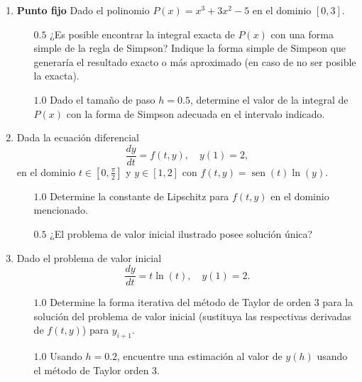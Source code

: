 \documentclass[12pt]{article}
\renewcommand{\sin}{\operatorname{sen}}
\DeclareMathOperator{\sen}{sen}
\renewcommand{\sin}{\sen}
\begin{document}
  \begin{enumerate}[leftmargin=*,widest=9]
    \item \textbf{Punto fijo} Dado el polinomio $P(x) = x^3 + 3x^2 - 5$ en el dominio $[0, 3]$.
    \begin{itemize}
    \item[$0.5$] ¿Es posible encontrar la integral exacta de $P(x)$ con una forma simple de la regla de Simpson? Indique la forma simple de Simpson que generaría el resultado exacto o más aproximado (en caso de no ser posible la exacta).
    
    \vspace{1cm}
    
    \item[$1.0$] Dado el tamaño de paso $h= 0.5$, determine el valor de la integral de $P(x)$ con la forma de Simpson adecuada en el intervalo indicado.
    
    \vspace{4cm}
    
    
    \end{itemize}
    
 \item Dada la ecuación diferencial $$ \frac{dy}{dt} = f(t, y), \quad y(1)= 2,$$ en el dominio $t \in \left[0, \frac{\pi}{2} \right]$ y $y \in [1, 2]$ con $f(t, y) = \sin(t) \ln(y)$.
    
    \begin{itemize}
    \item[$1.0$] Determine la constante de Lipschitz para $f(t, y)$ en el dominio mencionado.
    
    \vspace{6cm}
    
    \item[$0.5$] ¿El problema de valor inicial ilustrado posee solución única?
    
    \vspace{.5cm}
    
    \end{itemize}
    
    \item Dado el problema de valor inicial $$ \frac{dy}{dt} = t\ln(t), \quad y(1)=2. $$
    \begin{itemize}
    \item[$1.0$] Determine la forma iterativa del método de Taylor de orden 3 para la solución del problema de valor inicial (sustituya las respectivas derivadas de $f(t, y)$) para $y_{i+1}$.
    
    \vspace{6cm}
    
    \item[$1.0$] Usando $h=0.2$, encuentre una estimación al valor de $y(h)$ usando el método de Taylor orden 3.
    
    \end{itemize}
    
  \end{enumerate}

  
\end{document}
